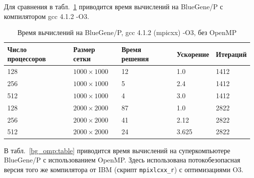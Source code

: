 \documentclass[12pt,notitlepage,oneside]{extarticle}
\begin{document}
Для сравнения в табл.~\ref{bg_gcc:table} приводится время вычислений на BlueGene/P
с компилятором gcc 4.1.2 -O3.

\begin{table}[h]
\centering
\caption{Время вычислений на BlueGene/P, gcc 4.1.2 (mpicxx) -O3, без OpenMP}
\label{bg_gcc:table}
\begin{tabular}{|l|l|l|l|l|}
\textbf{Число процессоров} & \textbf{Размер сетки} & \textbf{Время решения} & \textbf{Ускорение}      & \textbf{Итераций}        \\ \hline
128                        & $1000 \times 1000 $        &  12                   & 1.0                   & 1412                     \\
256                        & $1000 \times 1000 $        &  5                    & 2.4                   & 1412                         \\
512                        & $1000 \times 1000 $        &  4                     & 3.0                   & 1412                         \\ \hline
128                        & $2000 \times 2000 $        &  87                    & 1.0                   & 2822                     \\
256                        & $2000 \times 2000 $        &  41                    & 2.12                   & 2822                         \\
512                        & $2000 \times 2000 $        &  24                    & 3.625                   & 2822
\end{tabular}
\end{table}

В табл.~\ref{bg_omp:table} приводится время вычислений на суперкомпьютере
BlueGene/P с использованием OpenMP. Здесь использована потокобезопасная версия
того же компилятора от IBM (скрипт \texttt{mpixlcxx\_r}) с оптимизациями O3.
\end{document}
